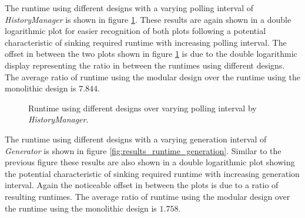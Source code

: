 The runtime using different designs with a varying polling interval of \emph{HistoryManager} is shown in figure \ref{fig:results_runtime_polling}.
These results are again shown in a double logarithmic plot for easier recognition of both plots following a potential characteristic of sinking required runtime with increasing polling interval.
The offset in between the two plots shown in figure \ref{fig:results_runtime_polling} is due to the double logarithmic display representing the ratio in between the runtimes using different designs.
The average ratio of runtime using the modular design over the runtime using the monolithic design is $7.844$.
\\
\begin{figure}
    \centering
    \caption{Runtime using different designs over varying polling interval by \emph{HistoryManager}.}
    \label{fig:results_runtime_polling}
\end{figure}

The runtime using different designs with a varying generation interval of \emph{Generator} is shown in figure \ref{fig:results_runtime_generation}.
Similar to the previous figure these results are also shown in a double logarithmic plot showing the potential characteristic of sinking required runtime with increasing generation interval.
Again the noticeable offset in between the plots is due to a ratio of resulting runtimes.
The average ratio of runtime using the modular design over the runtime using the monolithic design is $1.758$.
\\

